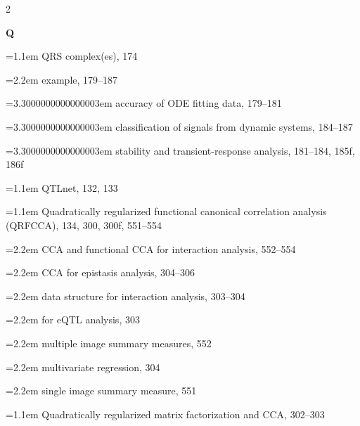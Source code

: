 \begin{multicols}{2}
\par{}\medskip\noindent\textbf{Q}\par\nobreak\smallskip\nobreak
\noindent\hangindent=1.1em QRS complex(es), 174\par
\noindent\hangindent=2.2em \hspace*{1.1em}example, 179--187\par
\noindent\hangindent=3.3000000000000003em \hspace*{2.2em}accuracy of ODE fitting data, 179--181\par
\noindent\hangindent=3.3000000000000003em \hspace*{2.2em}classification of signals from dynamic systems, 184--187\par
\noindent\hangindent=3.3000000000000003em \hspace*{2.2em}stability and transient-response analysis, 181--184, 185f, 186f\par
\noindent\hangindent=1.1em QTLnet, 132, 133\par
\noindent\hangindent=1.1em Quadratically regularized functional canonical correlation analysis (QRFCCA), 134, 300, 300f, 551--554\par
\noindent\hangindent=2.2em \hspace*{1.1em}CCA and functional CCA for interaction analysis, 552--554\par
\noindent\hangindent=2.2em \hspace*{1.1em}CCA for epistasis analysis, 304--306\par
\noindent\hangindent=2.2em \hspace*{1.1em}data structure for interaction analysis, 303--304\par
\noindent\hangindent=2.2em \hspace*{1.1em}for eQTL analysis, 303\par
\noindent\hangindent=2.2em \hspace*{1.1em}multiple image summary measures, 552\par
\noindent\hangindent=2.2em \hspace*{1.1em}multivariate regression, 304\par
\noindent\hangindent=2.2em \hspace*{1.1em}single image summary measure, 551\par
\noindent\hangindent=1.1em Quadratically regularized matrix factorization and CCA, 302--303\par

\end{multicols}
